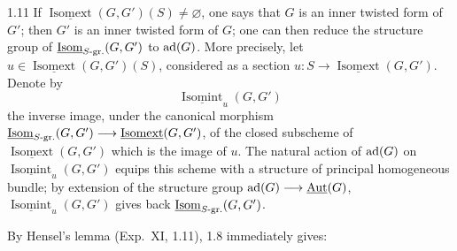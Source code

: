 \begin{remark}{1.11}\label{XXIV.1.11}
If $\underline{\operatorname{Isomext}}(G,G')(S)\ne\varnothing$, one says that $G$ is an inner twisted form of $G'$; then $G'$ is an inner twisted form of $G$; one can then reduce the structure group of $\underline{\operatorname{Isom}}_{S\text{-gr.}}(G,G')$ to $\operatorname{ad}(G)$. More precisely, let $u\in\underline{\operatorname{Isomext}}(G,G')(S)$, considered as a section $u:S\to\underline{\operatorname{Isomext}}(G,G')$. Denote by
\[
\underline{\operatorname{Isomint}}_u(G,G')
\]
the inverse image, under the canonical morphism $\underline{\operatorname{Isom}}_{S\text{-gr.}}(G,G')\longrightarrow\underline{\operatorname{Isomext}}(G,G')$, of the closed subscheme of $\underline{\operatorname{Isomext}}(G,G')$ which is the image of $u$. The natural action of $\operatorname{ad}(G)$ on $\underline{\operatorname{Isomint}}_u(G,G')$ equips this scheme with a structure of principal homogeneous bundle; by extension of the structure group $\operatorname{ad}(G)\longrightarrow\underline{\operatorname{Aut}}(G)$, $\underline{\operatorname{Isomint}}_u(G,G')$ gives back $\underline{\operatorname{Isom}}_{S\text{-gr.}}(G,G')$.
\end{remark}
By Hensel's lemma (Exp.~XI, 1.11), 1.8 immediately gives:

